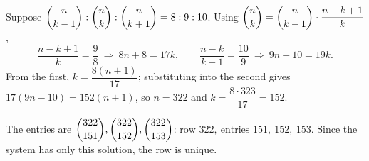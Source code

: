 Suppose $\dbinom{n}{k-1}:\dbinom nk:\dbinom n{k+1}=8:9:10$. Using $\dbinom nk=\dbinom n{k-1}\cdot\dfrac{n-k+1}{k}$,
\[\dfrac{n-k+1}{k}=\dfrac98\ \Longrightarrow\ 8n+8=17k,\qquad\dfrac{n-k}{k+1}=\dfrac{10}{9}\ \Longrightarrow\ 9n-10=19k.\]
From the first, $k=\dfrac{8(n+1)}{17}$; substituting into the second gives $17(9n-10)=152(n+1)$, so $n=322$ and $k=\dfrac{8\cdot323}{17}=152$.

The entries are $\dbinom{322}{151},\dbinom{322}{152},\dbinom{322}{153}$: $\boxed{\text{row }322,\ \text{entries }151,\ 152,\ 153}$. Since the system has only this solution, the row is unique.

